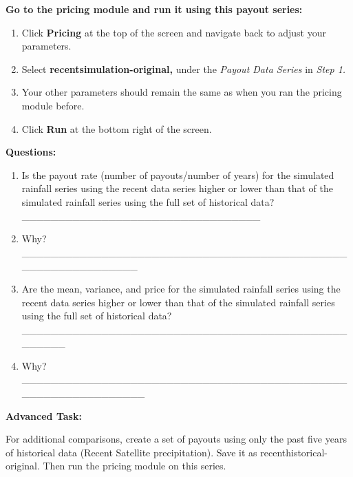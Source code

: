 \documentclass[letterpaper,10pt,english]{sphinxmanual}
\begin{document}
\textbf{Go to the pricing module and run it using this payout series:}
\begin{enumerate}
\item {} 
Click \textbf{Pricing} at the top of the screen and navigate back to adjust your parameters.

\item {} 
Select \textbf{recentsimulation-original,} under the \emph{Payout Data Series} in \emph{Step 1.}

\item {} 
Your other parameters should remain the same as when you ran the pricing module before.

\item {} 
Click \textbf{Run} at the bottom right of the screen.

\end{enumerate}

\textbf{Questions:}
\begin{enumerate}
\item {} 
Is the payout rate (number of payouts/number of years) for the simulated rainfall series using the recent data series higher or lower than that of the simulated rainfall series using the full set of historical data? \_\_\_\_\_\_\_\_\_\_\_\_\_\_\_\_\_\_\_\_\_\_\_\_\_\_\_\_\_\_\_\_\_

\item {} 
Why? \_\_\_\_\_\_\_\_\_\_\_\_\_\_\_\_\_\_\_\_\_\_\_\_\_\_\_\_\_\_\_\_\_\_\_\_\_\_\_\_\_\_\_\_\_\_\_\_\_\_\_\_\_\_\_\_\_\_\_\_\_

\item {} 
Are the mean, variance, and price for the simulated rainfall series using the recent data series higher or lower than that of the simulated rainfall series using the full set of historical data? \_\_\_\_\_\_\_\_\_\_\_\_\_\_\_\_\_\_\_\_\_\_\_\_\_\_\_\_\_\_\_\_\_\_\_\_\_\_\_\_\_\_\_\_\_\_\_\_\_\_\_

\item {} 
Why? \_\_\_\_\_\_\_\_\_\_\_\_\_\_\_\_\_\_\_\_\_\_\_\_\_\_\_\_\_\_\_\_\_\_\_\_\_\_\_\_\_\_\_\_\_\_\_\_\_\_\_\_\_\_\_\_\_\_\_\_\_\_

\end{enumerate}

\textbf{Advanced Task:}

For additional comparisons, create a set of payouts using only the past five years of historical data (Recent Satellite precipitation). Save it as recenthistorical-original.  Then run the pricing module on this series.
\end{document}
